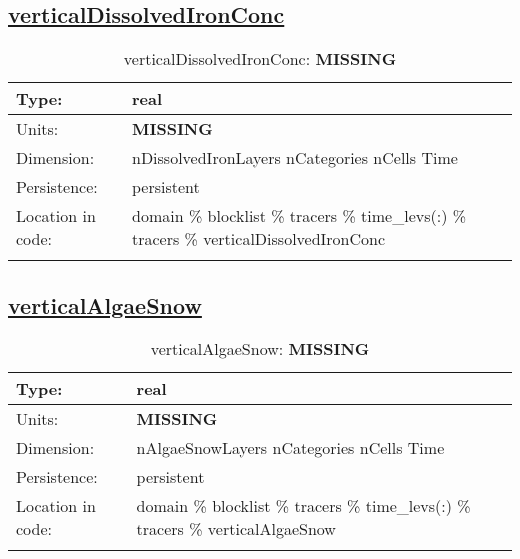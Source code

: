 \subsection[verticalDissolvedIronConc]{\hyperref[sec:var_tab_tracers]{verticalDissolvedIronConc}}
\label{subsec:var_sec_tracers_verticalDissolvedIronConc}
\begin{center}
\begin{longtable}{| p{2.0in} | p{4.0in} |}
        \hline 
        Type: & real \\
        \hline 
        Units: & {\bf \color{red} MISSING} \\
        \hline 
        Dimension: & nDissolvedIronLayers nCategories nCells Time \\
        \hline 
        Persistence: & persistent \\
        \hline 
         Location in code: & domain \% blocklist \% tracers \% time\_levs(:) \% tracers \% verticalDissolvedIronConc \\
         \hline 
    \caption{verticalDissolvedIronConc: {\bf \color{red} MISSING}}
\end{longtable}
\end{center}
\subsection[verticalAlgaeSnow]{\hyperref[sec:var_tab_tracers]{verticalAlgaeSnow}}
\label{subsec:var_sec_tracers_verticalAlgaeSnow}
\begin{center}
\begin{longtable}{| p{2.0in} | p{4.0in} |}
        \hline 
        Type: & real \\
        \hline 
        Units: & {\bf \color{red} MISSING} \\
        \hline 
        Dimension: & nAlgaeSnowLayers nCategories nCells Time \\
        \hline 
        Persistence: & persistent \\
        \hline 
         Location in code: & domain \% blocklist \% tracers \% time\_levs(:) \% tracers \% verticalAlgaeSnow \\
         \hline 
    \caption{verticalAlgaeSnow: {\bf \color{red} MISSING}}
\end{longtable}
\end{center}
